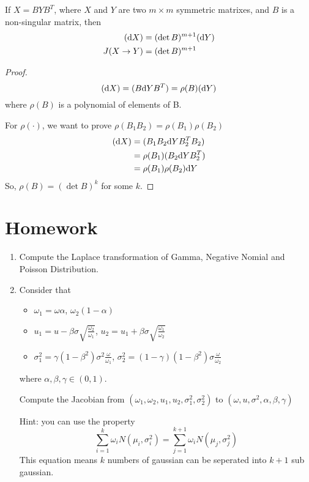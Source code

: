 	\begin{theorem}
		If $X = BYB^T$, where $X$ and $Y$ are two $m\times m$ symmetric matrixes, and $B$ is a non-singular matrix, then
		\begin{align*}
			(\mathrm{d} X) &= (\det B)^{m+1} (\mathrm{d} Y)\\
			J(X\to Y) &= (\det B)^{m+1}
		\end{align*}
	\end{theorem}
	\begin{proof}
		$$(\mathrm{d} X) = (B\mathrm{d} Y B^T) = \rho(B)(\mathrm{d} Y)$$
		where $\rho(B)$ is a polynomial of elements of B.
		
		For $\rho(\cdot)$, we want to prove $\rho(B_1B_2) = \rho(B_1)\rho(B_2)$
		\begin{align*}
			(\mathrm{d} X) & = (B_1B_2\mathrm{d} YB_2^TB_2) \\
			&= \rho(B_1)(B_2\mathrm{d} YB_2^T)\\
			& = \rho(B_1)\rho(B_2)\mathrm{d} Y
		\end{align*}
	So, $\rho(B) = (\det B)^k$ for some $k$.
	\end{proof}
	
	\begin{definition}
		
	\end{definition}
\section{Homework}
	\begin{enumerate}
		\item Compute the Laplace transformation of Gamma, Negative Nomial and Poisson Distribution.
		
		\item Consider that 
		\begin{itemize}
			\item $\omega_1 = \omega \alpha$, $\omega_2(1-\alpha)$
			\item $u_1 = u-\beta \sigma \sqrt{\frac{\omega_2}{\omega_1}}$, $u_2 = u_1+\beta \sigma \sqrt{\frac{\omega_1}{\omega_2}}$
			\item $\sigma_1^2 = \gamma(1-\beta^2)\sigma^2\frac{\omega}{\omega_1}$, $\sigma^2_2 = (1-\gamma)(1-\beta^2)\sigma\frac{\omega}{\omega_2}$
		\end{itemize}
	where $\alpha, \beta, \gamma \in (0, 1)$.
	
	Compute the Jacobian from $(\omega_1, \omega_2, u_1, u_2, \sigma_1^2, \sigma_2^2)$ to $(\omega, u, \sigma^2, \alpha, \beta, \gamma)$
	
	Hint: you can use the property $$\sum_{i = 1}^{k} \omega_i  N(\mu_i, \sigma_i^2) = \sum_{j=1}^{k+1}\omega_i N(\mu_j, \sigma_j^2)$$
	This equation means $k$ numbers of gaussian can be seperated into $k+1$ sub gaussian.
	\end{enumerate}